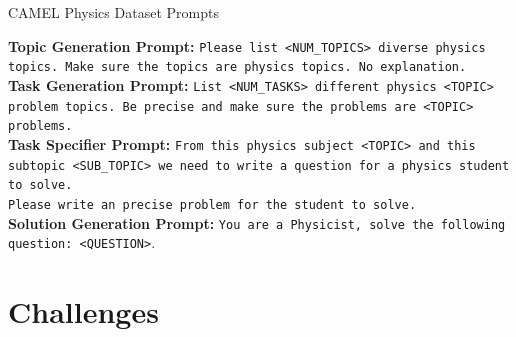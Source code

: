 \begin{AIBox}{CAMEL Physics Dataset Prompts}

\textbf{Topic Generation Prompt:}
\texttt{Please list <NUM\_TOPICS> diverse physics topics.
Make sure the topics are physics topics.
No explanation.
}\\

\textbf{Task Generation Prompt:}
    \texttt{List <NUM\_TASKS> different physics <TOPIC> problem topics. Be precise and make sure the problems are <TOPIC> problems.} \\

\textbf{Task Specifier Prompt:} \texttt{From this physics subject <TOPIC> and this subtopic <SUB\_TOPIC> we need to write a question for a physics student to solve. \\
Please write an precise problem for the student to solve.}\\

\textbf{Solution Generation Prompt:} 
\texttt{You are a Physicist, solve the following question: <QUESTION>}.


\end{AIBox}



\clearpage
\section{Challenges}

